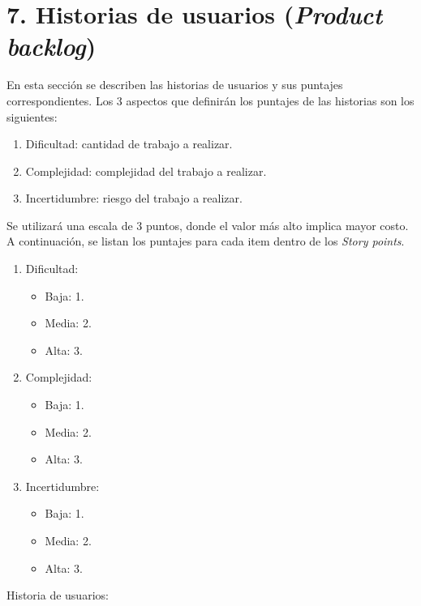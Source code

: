 \documentclass[
11pt, %
]{charter}
\begin{document}
\section{7. Historias de usuarios (\textit{Product backlog})}
\label{sec:backlog}

En esta sección se describen las historias de usuarios y sus puntajes correspondientes. Los 3 aspectos que definirán los puntajes de las historias son los siguientes:

\begin{enumerate}
\item Dificultad: cantidad de trabajo a realizar.
\item Complejidad: complejidad del trabajo a realizar.
\item Incertidumbre: riesgo del trabajo a realizar.
\end{enumerate}

Se utilizará una escala de 3 puntos, donde el valor más alto implica mayor costo. A continuación, se listan los puntajes para cada item dentro de los \textit{Story points}.

\begin{enumerate}
\item Dificultad:
\begin{itemize}
	\item Baja: 1.
	\item Media: 2.
	\item Alta: 3.
\end{itemize}
\item Complejidad:
\begin{itemize}
	\item Baja: 1.
	\item Media: 2.
	\item Alta: 3.
\end{itemize}
\item Incertidumbre:
\begin{itemize}
	\item Baja: 1.
	\item Media: 2.
	\item Alta: 3.
\end{itemize}
\end{enumerate}

Historia de usuarios:
\end{document}
